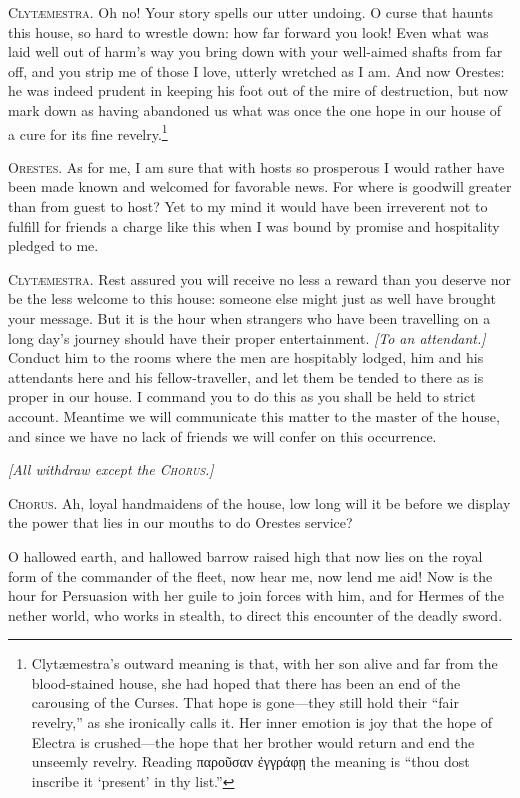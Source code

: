 \documentclass[12pt]{article}
\begin{document}
\textsc{Clyt{\ae}mestra.} Oh no! Your story spells our utter undoing. O curse that haunts this house, so hard to wrestle down: how far forward you look! Even what was laid well out of harm's way you bring down with your well-aimed shafts from far off, and you strip me of those I love, utterly wretched as I am. And now Orestes: he was indeed prudent in keeping his foot out of the mire of destruction, but now mark down as having abandoned us what was once the one hope in our house of a cure for its fine revelry.\footnote{Clyt{\ae}mestra's outward meaning is that, with her son alive and far from the blood-stained house, she had hoped that there has been an end of the carousing of the Curses. That hope is gone---they still hold their ``fair revelry,'' as she ironically calls it. Her inner emotion is joy that the hope of Electra is crushed---the hope that her brother would return and end the unseemly revelry. Reading παροῦσαν ἐγγράφῃ the meaning is ``thou dost inscribe it `present' in thy list.''}

\textsc{Orestes.} As for me, I am sure that with hosts so prosperous I would rather have been made known and welcomed for favorable news. For where is goodwill greater than from guest to host? Yet to my mind it would have been irreverent not to fulfill for friends a charge like this when I was bound by promise and hospitality pledged to me.

\textsc{Clyt{\ae}mestra.} Rest assured you will receive no less a reward than you deserve nor be the less welcome to this house: someone else might just as well have brought your message. But it is the hour when strangers who have been travelling on a long day's journey should have their proper entertainment. \textit{[To an attendant.]} Conduct him to the rooms where the men are hospitably lodged, him and his attendants here and his fellow-traveller, and let them be tended to there as is proper in our house. I command you to do this as you shall be held to strict account. Meantime we will communicate this matter to the master of the house, and since we have no lack of friends we will confer on this occurrence.

\begin{center}
\textit{[All withdraw except the \textsc{Chorus.}]}
\end{center}

\textsc{Chorus.} Ah, loyal handmaidens of the house, low long will it be before we display the power that lies in our mouths to do Orestes service?

O hallowed earth, and hallowed barrow raised high that now lies on the royal form of the commander of the fleet, now hear me, now lend me aid! Now is the hour for Persuasion with her guile to join forces with him, and for Hermes of the nether world, who works in stealth, to direct this encounter of the deadly sword.
\end{document}
